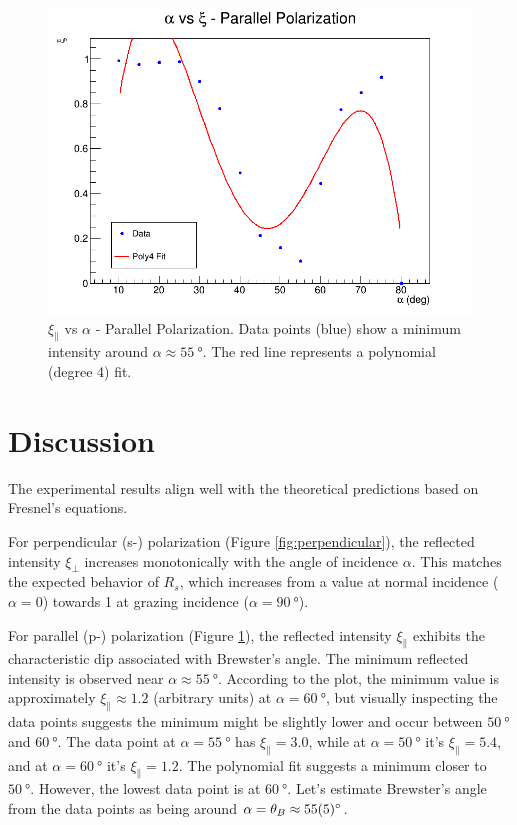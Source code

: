 \documentclass[journal]{IEEEtran}
\begin{document}
\begin{figure}[H]
    \centering
    \includegraphics[width=\linewidth]{../plots/parallel_plot.png}
    \caption{$\xi_{\parallel}$ vs $\alpha$ - Parallel Polarization. Data points (blue) show a minimum intensity around $\alpha \approx \SI{55}{\degree}$. The red line represents a polynomial (degree 4) fit.}
    \label{fig:parallel}
\end{figure}

\section{Discussion}
The experimental results align well with the theoretical predictions based on Fresnel's equations.

For perpendicular (s-) polarization (Figure \ref{fig:perpendicular}), the reflected intensity $\xi_{\perp}$ increases monotonically with the angle of incidence $\alpha$. This matches the expected behavior of $R_s$, which increases from a value at normal incidence ($\alpha=0$) towards 1 at grazing incidence ($\alpha=\SI{90}{\degree}$).

For parallel (p-) polarization (Figure \ref{fig:parallel}), the reflected intensity $\xi_{\parallel}$ exhibits the characteristic dip associated with Brewster's angle. The minimum reflected intensity is observed near $\alpha \approx \SI{55}{\degree}$. According to the plot, the minimum value is approximately $\xi_{\parallel} \approx 1.2$ (arbitrary units) at $\alpha = \SI{60}{\degree}$, but visually inspecting the data points suggests the minimum might be slightly lower and occur between $\SI{50}{\degree}$ and $\SI{60}{\degree}$. The data point at $\alpha = \SI{55}{\degree}$ has $\xi_{\parallel} = 3.0$, while at $\alpha = \SI{50}{\degree}$ it's $\xi_{\parallel} = 5.4$, and at $\alpha = \SI{60}{\degree}$ it's $\xi_{\parallel} = 1.2$. The polynomial fit suggests a minimum closer to $\SI{50}{\degree}$. However, the lowest data point is at $\SI{60}{\degree}$. Let's estimate Brewster's angle from the data points as being around $\alpha = \theta_B \approx \SI{55 \pm 5}{\degree}$.
\end{document}
